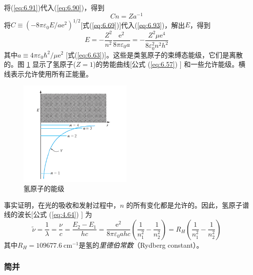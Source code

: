     将(\ref{eq:6.91})代入(\ref{eq:6.90})，得到
    \begin{equation}
        Cn = Za^{-1}
        \label{eq:6.93}
    \end{equation}
    将$C \equiv \left(-8\pi\varepsilon_0E/a\mathrm{e}^2\right)^{1/2}$[式(\ref{eq:6.69})]代入(\ref{eq:6.93})，解出$E$，得到
    \begin{equation}
        E = -\frac{Z^2}{n^2}\frac{\mathrm{e}^2}{8\pi\varepsilon_0a} = -\frac{Z^2\mu\mathrm{e}^4}{8\varepsilon_0^2n^2h^2}
        \label{eq:6.94}
    \end{equation}
    其中$a \equiv 4\pi\varepsilon_0\hbar^2/\mu\mathrm{e}^2$ [式(\ref{eq:6.63})]。这些是类氢原子的束缚态能级，它们是离散的。图 \ref{fig:6.6} 显示了氢原子($Z=1$)的势能曲线[公式 (\ref{eq:6.57}) ] 和一些允许能级。横线表示允许使用所有正能量。
    \begin{figure}
        \centering
        \includegraphics[width=0.5\textwidth]{Figures/6.6.png}
        \caption{氢原子的能级}
        \label{fig:6.6}
    \end{figure}

    事实证明，在光的吸收和发射过程中，$n$ 的所有变化都是允许的。因此，氢原子谱线的波长[公式 (\ref{eq:4.64}) ] 为
    \begin{equation}
        \tilde{\nu} = \frac{1}{\lambda} = \frac{\nu}{c} = \frac{E_2 - E_1}{hc} = \frac{\mathrm{e}^2}{8\pi\varepsilon_0ahc}\left(\frac{1}{n_1^2} - \frac{1}{n_2^2}\right) = R_H\left(\frac{1}{n_1^2} - \frac{1}{n_2^2}\right)
        \label{eq:6.95}
    \end{equation}
    其中$R_H = 109677.6 \: \mathrm{cm}^{-1}$是氢的\textit{里德伯常数}（Rydberg constant）。
    \\

\subsubsection*{简并}

